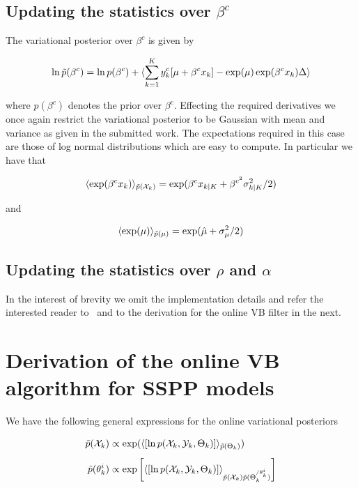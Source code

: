 \documentclass{article}
\begin{document}
\subsection{Updating the statistics over $\beta^c$}

The variational posterior over $\beta^c$ is given by

\begin{equation*}
\ln \tilde{p}(\beta^c) = \ln p(\beta^c) + \langle \sum_{k=1}^K y^c_k[\mu + \beta^c x_k] - \exp(\mu)\exp(\beta^cx_k)\Delta \rangle
\end{equation*}

\noindent where $p(\beta^c)$ denotes the prior over $\beta^c$. Effecting the required derivatives we once again restrict the variational posterior to be Gaussian with mean and variance as given in the submitted work. The expectations required in this case are those of log normal distributions which are easy to compute. In particular we have that

\begin{equation*}
\langle \exp(\beta^cx_k) \rangle_{\tilde{p}(\mathcal{X}_k)} = \exp(\beta^cx_{k|K} + \beta^{c^2}\sigma^2_{k|K}/2)
\end{equation*}

and

\begin{equation*}
\langle \exp(\mu) \rangle_{\tilde{p}(\mu)} = \exp(\hat{\mu} + \sigma^2_{\mu}/2)
\end{equation*}

\subsection{Updating the statistics over $\rho$ and $\alpha$}

In the interest of brevity we omit the implementation details and refer the interested reader to~\cite{Beal_2003b} and to the derivation for the online VB filter in the next.

\section{Derivation of the online VB algorithm for SSPP models}

We have the following general expressions for the online variational posteriors

\begin{subequations}\label{eq:VBmarginals}
\begin{align}
 \pt(\Xk)&\propto \exp(\langle[\ln p(\Xk,\Yk,\Thetak)]\rangle_{\pt(\Thetak)}) \label{eq:xkmarginal}\\[1ex]
 \pt(\theta^i_k)&\propto \exp\bigg[\langle[\ln p(\Xk,\Yk,\Thetak)]\rangle_{\pt(\Xk)\pt(\Thetak^{/\theta_k^i})}\bigg] \label{eq:thetakmarginal}
\end{align}
\end{subequations}
\normalsize
\end{document}
